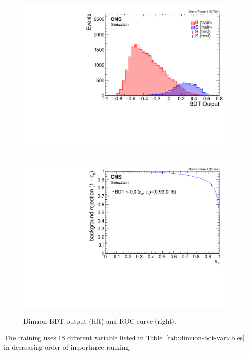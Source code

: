\begin{figure}[!htb]
\centering
\includegraphics[width=0.48\linewidth]{plots/dimuon_bdt/overtraining_Event_Dilepton_Muons_Phase_1.pdf} \,
\includegraphics[width=0.48\linewidth]{plots/dimuon_bdt/roc_Event_Dilepton_Muons_Phase_1.pdf} \\


\caption[Dimuon BDT output and ROC curve]{Dimuon BDT output (left) and ROC curve (right).}
\label{fig:event-bdt-dimuon-output}
\end{figure}

The training uses 18 different variable listed in Table~\ref{tab:dimuon-bdt-variables} in decreasing order of importance ranking.

